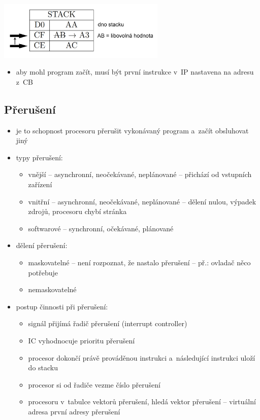 \documentclass[a4paper,12pt]{article}
\providecommand{\tightlist}{%
\setlength{\itemsep}{0pt}\setlength{\parskip}{0pt}}
\begin{document}
\includegraphics[width=8cm]{ref/podprogram-stack.png}

\begin{itemize}
\tightlist
\item aby mohl program začít, musí být první instrukce v~IP nastavena na
  adresu z~CB
\end{itemize}

\subsection{Přerušení}

\begin{itemize}
\tightlist
\item je to schopnost procesoru přerušit vykonávaný program a~začít
  obsluhovat jiný
\item typy přerušení:

  \begin{itemize}
  \tightlist
  \item vnější -- asynchronní, neočekávané, neplánované -- přichází od
    vstupních zařízení
  \item vnitřní -- asynchronní, neočekávané, neplánované -- dělení nulou,
    výpadek zdrojů, procesoru chybí stránka
  \item softwarové -- synchronní, očekávané, plánované
  \end{itemize}
\item dělení přerušení:

  \begin{itemize}
  \tightlist
  \item maskovatelné -- není rozpoznat, že nastalo přerušení -- př.: ovladač
    něco potřebuje
  \item nemaskovatelné
  \end{itemize}
\item postup činnosti při přerušení:

  \begin{itemize}
  \tightlist
  \item signál přijímá řadič přerušení (interrupt controller)
  \item IC vyhodnocuje prioritu přerušení
  \item procesor dokončí právě prováděnou instrukci a~následující instrukci
    uloží do stacku
  \item procesor si od řadiče vezme číslo přerušení
  \item procesoru v~tabulce vektorů přerušení, hledá vektor přerušení --
    virtuální adresa první adresy přerušení
  \end{itemize}
\end{itemize}
\end{document}
